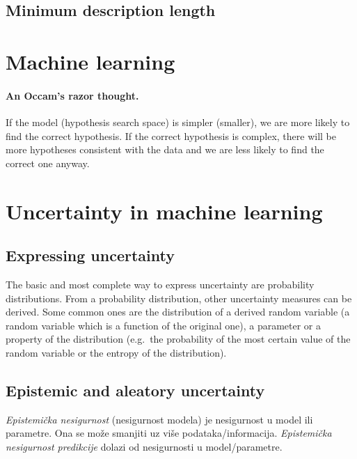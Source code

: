 \documentclass{article}
\begin{document}
\subsection{Minimum description length}


\section{Machine learning}

\paragraph{An Occam's razor thought.} If the model (hypothesis search space) is simpler (smaller), we are more likely to find the correct hypothesis. If the correct hypothesis is complex, there will be more hypotheses consistent with the data and we are less likely to find the correct one anyway.


\section{Uncertainty in machine learning}

\subsection{Expressing uncertainty}

The basic and most complete way to express uncertainty are probability distributions. From a probability distribution, other uncertainty measures can be derived. Some common ones are the distribution of a derived random variable (a random variable which is a function of the original one), a parameter or a property of the distribution (e.g.\ the probability of the most certain value of the random variable or the entropy of the distribution).


\subsection{Epistemic and aleatory uncertainty}

\emph{Epistemička nesigurnost} (nesigurnost modela) je nesigurnost u model ili parametre. Ona se može smanjiti uz više podataka/informacija. \emph{Epistemička nesigurnost predikcije} dolazi od nesigurnosti u model/parametre.
\end{document}
